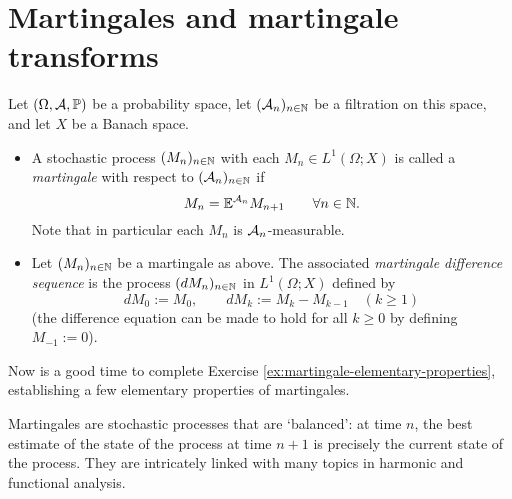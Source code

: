 \section{Martingales and martingale transforms}

\begin{defn}
  Let $(\Omega, \mathcal{A}, \mathbb{P})$ be a probability space, let $(\mathcal{A}_n)_{n \in \mathbb{N}}$ be a filtration on this space,  and let $X$ be a Banach space.
  \begin{itemize}
  \item
    A stochastic process $(M_n)_{n \in \mathbb{N}}$ with each $M_n \in L^1(\Omega; X)$ is called a \emph{martingale} with respect to $(\mathcal{A}_n)_{n \in \mathbb{N}}$ if 
    \begin{equation}\label{eq:mgale-defining-property}
      M_n = \mathbb{E}^{\mathcal{A}_n} M_{n+1} \qquad \forall n \in \mathbb{N}.
    \end{equation}
    Note that in particular each $M_n$ is $\mathcal{A}_n$-measurable.

  \item
    Let $(M_n)_{n \in \mathbb{N}}$ be a martingale as above.
    The associated \emph{martingale difference sequence} is the process $(dM_n)_{n \in \mathbb{N}}$ in $L^1(\Omega; X)$ defined by
    \begin{equation*}
      dM_0 := M_0, \qquad dM_k := M_k - M_{k-1} \quad (k \geq 1)
    \end{equation*}
    (the difference equation can be made to hold for all $k \geq 0$ by defining $M_{-1} := 0$).
  \end{itemize}
\end{defn}

\begin{rmk}
  Now is a good time to complete Exercise \ref{ex:martingale-elementary-properties}, establishing a few elementary properties of martingales. 
\end{rmk}

Martingales are stochastic processes that are `balanced': at time $n$, the best estimate of the state of the process at time $n+1$ is precisely the current state of the process.
They are intricately linked with many topics in harmonic and functional analysis.

